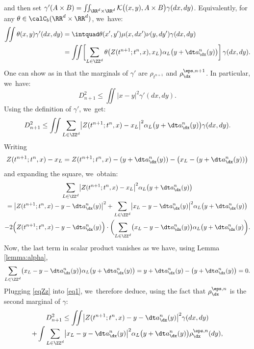 and then set $\gamma'(A \times B) = \iint_{\RR^d \times \RR^d} {\mathcal K} \bigl( (x,y),A \times B \bigr)
\gamma(dx,dy)$. Equivalently, for any $\theta \in \calC_b(\RR^d \times \RR^d)$, we~have:
\begin{align*}
\iint \theta(x,y) \gamma'(dx,dy) & = \intquad \theta(x',y') \mu(x, dx') \nu(y, dy') \gamma(dx,dy) \\
& = \iint \biggl[\sum_{L\in \ZZ^d} \theta\bigl(Z(t^{n+1};t^n,x),x_L\bigr)
\alpha_L\bigl(y+\dt a^n_{\dx}(y)\bigr)\biggr]\,\gamma(dx,dy).
\end{align*}
One can show as in \cite{dlv20} that the marginals of $\gamma'$ are $\rho_{t^{n+1}}$ and $\rho_{\dx}^{\eps,n+1}$. In particular, we~have:
\[
D_{n+1}^2 \leq \iint |x-y|^2 \gamma'(dx,dy).
\]
Using the definition of $\gamma'$, we~get:
\begin{equation}\label{eq1}
D_{n+1}^2 \leq \iint \sum_{L\in \ZZ^d} \bigl|Z(t^{n+1};t^n,x)-x_L\bigr|^2 \alpha_L \bigl(y+\dt a^n_{\dx}(y)\bigr) \gamma(dx,dy).
\end{equation}
Writing
\[
Z(t^{n+1};t^n,x)-x_L = Z(t^{n+1};t^n,x) - (y+\dt a^n_{\dx}(y)) - \big(x_L - (y+\dt a^n_{\dx}(y))\big)
\]
and expanding the square, we~obtain:\vspace*{-3pt}
\begin{multline}\label{eqZz}
\sum_{L\in \ZZ^d}\bigl|Z(t^{n+1};t^n,x) - x_L\bigr|^2 \alpha_L\bigl(y+\dt a^n_{\dx}(y)\bigr)\\
= \bigl|Z(t^{n+1};t^n,x) - y - \dt a^n_{\dx}(y) \bigr|^2 + \sum_{L\in \ZZ^d} \bigl|x_L - y - \dt a^n_{\dx}(y)
\bigr|^2 \alpha_L\bigl(y+\dt a^n_{\dx}(y)\bigr)
\\
-2\Bigl( Z(t^{n+1};t^n,x) - y - \dt a^n_{\dx}(y) \Bigr) \cdot
\biggl( \sum_{L \in \ZZ^d}
\bigl(x_L-y-\dt a^n_{\dx}(y)\bigr) \alpha_L\bigl(y+\dt a^n_{\dx}(y) \biggr).
\end{multline}
Now, the last term in scalar product vanishes as we have, using Lemma \ref{lemma:alpha},\vspace*{-3pt}
\[
\sum_{L\in \ZZ^d} \bigl(x_L-y-\dt a^n_{\dx}(y)\bigr) \alpha_L\bigl(y+\dt a^n_{\dx}(y)\bigr) = y+\dt a^n_{\dx}(y) - \big(y+\dt a^n_{\dx}(y)\big) = 0.
\]
Plugging \eqref{eqZz} into \eqref{eq1}, we~therefore deduce, using the fact that $\rho_{\dx}^{\eps,n}$ is the second marginal of $\gamma$:\vspace*{-3pt}
\begin{multline}\label{eq2}
D_{n+1}^2 \leq
\iint \bigl|Z(t^{n+1};t^n,x)-y-\dt a^n_{\dx}(y)\bigr|^2 \gamma(dx,dy) \\[-3pt]
+ \int \sum_{L\in \ZZ^d} \bigl|x_L-y-\dt a^n_{\dx}(y) \bigr|^2 \alpha_L\bigl(y+\dt a^n_{\dx}(y)\bigr) \rho_{\dx}^{\eps,n}(dy),
\end{multline}
